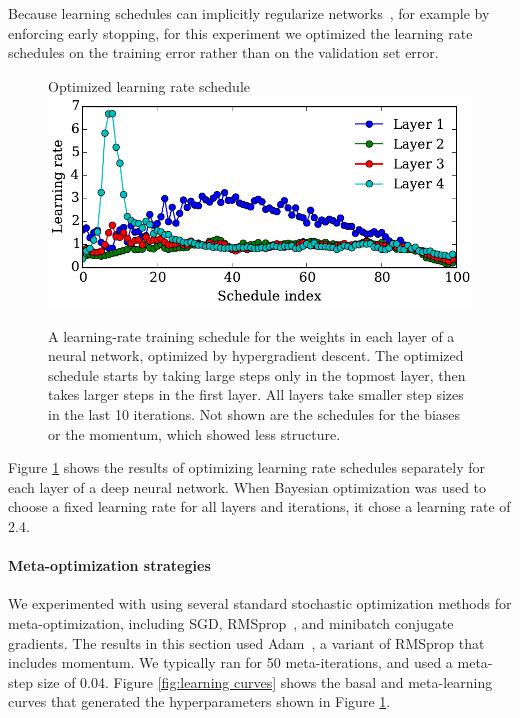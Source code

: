 \documentclass{article}
\newcommand{\primal}{basal }
\begin{document}
Because learning schedules can implicitly regularize networks~\cite{erhan2010does}, for example by enforcing early stopping, for this experiment we optimized the learning rate schedules on the training error rather than on the validation set error.
%
\begin{figure}[h!]
\vskip 0.1in
\begin{center}
Optimized learning rate schedule \\
\includegraphics[width=\columnwidth]{../experiments/Feb_3_training_schedules/3_adam_50/schedules_small.pdf}
\vskip -0.1in
\caption{A learning-rate training schedule for the weights in each layer of a neural network, optimized by hypergradient descent.
The optimized schedule starts by taking large steps only in the topmost layer, then takes larger steps in the first layer.
All layers take smaller step sizes in the last 10 iterations.
Not shown are the schedules for the biases or the momentum, which showed less structure.}
\label{fig:optimal schedule}
\end{center}
\vskip -0.1in
\end{figure} 
%
Figure \ref{fig:optimal schedule} shows the results of optimizing learning rate schedules separately for each layer of a deep neural network.
When Bayesian optimization was used to choose a fixed learning rate for all layers and iterations, it chose a learning rate of 2.4.

\paragraph{Meta-optimization strategies}
We experimented with using several standard stochastic optimization methods for meta-optimization, including SGD, RMSprop~\citep{Tieleman2012}, and minibatch conjugate gradients.
The results in this section used Adam~\citep{Adam14}, a variant of RMSprop that includes momentum.
We typically ran for 50 meta-iterations, and used a meta-step size of 0.04.
Figure \ref{fig:learning curves} shows the \primal{} and meta-learning curves that generated the hyperparameters shown in Figure \ref{fig:optimal schedule}.
\end{document}
